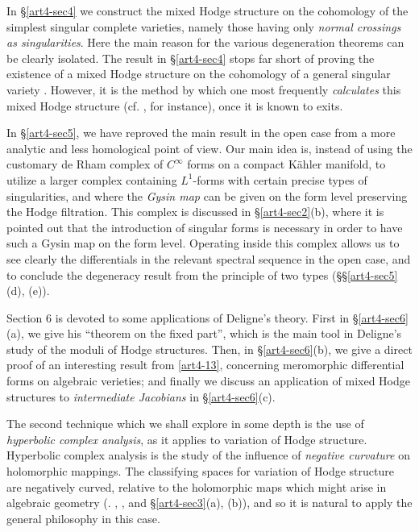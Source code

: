 In \S \ref{art4-sec4} we construct the mixed Hodge structure on the cohomology of the simplest singular complete varieties, namely those having only \textit{normal crossings as singularities}. Here the main reason for the various degeneration theorems can be clearly isolated. The result in \S \ref{art4-sec4} stops far short of proving the existence of a mixed Hodge structure on the cohomology of a general singular variety \cite{art4-key14}. However, it is the method by which one most frequently \textit{calculates} this mixed Hodge structure (cf. \cite{art4-key10}, for instance), once it is known to exits.

In \S \ref{art4-sec5}, we have reproved the main result in the open case \cite{art4-key13} from a more analytic and less homological point of view. Our main idea is, instead of using the customary de Rham complex of $C^\infty$ forms on a compact K\"ahler manifold, to utilize a larger complex containing $L^1$-forms with certain precise types of singularities, and where the \textit{Gysin map} can be given on the form level preserving the Hodge filtration. This complex is discussed in \S\ref{art4-sec2}(b), where it is pointed out that the introduction of singular forms is necessary in order to have such a Gysin map on the form level. Operating inside this complex allows us to see clearly the differentials in the relevant spectral sequence in the open case, and to conclude the degeneracy result from the principle of two types (\S\S\ref{art4-sec5}(d), (e)).

Section 6 is devoted to some applications of Deligne's theory. First in \S \ref{art4-sec6}(a), we give his ``theorem on the fixed part'', which is the main tool in Deligne's study of the moduli of Hodge structures. Then, in \S\ref{art4-sec6}(b), we give a direct proof of an interesting result from \ref{art4-13}, concerning meromorphic differential forms on algebraic verieties; and finally we discuss an application of mixed Hodge structures to \textit{intermediate Jacobians} in \S \ref{art4-sec6}(c).

The second technique which we shall explore in some depth is the use of \textit{hyperbolic complex analysis}, as it applies to variation of Hodge structure. Hyperbolic complex analysis is the study of the influence of \textit{negative curvature} on holomorphic mappings. The classifying spaces for variation of Hodge structure are negatively curved, relative to the holomorphic maps which might arise in algebraic geometry (\cf. \cite{art4-key11}, \cite{art4-key25}, and \S \ref{art4-sec3}(a), (b)), and so it is natural to apply the general philosophy in this case.

